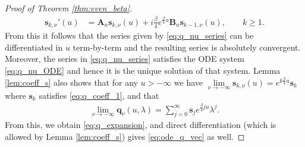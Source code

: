 \documentclass[12pt]{article}
\theoremstyle{definition} %
\theoremstyle{remark} %
\begin{document}
\begin{proof}[Proof of Theorem \ref{thm:even_beta}]
\begin{align}
        \mathbf{s}_{k,\nu}'(u)&= \mathbf{A}_n \mathbf{s}_{k,\nu}(u)+ i \tfrac{\beta}{4}e^{\frac{\beta}{4}u}\mathbf{B}_n \mathbf{s}_{k-1,\nu}(u), \qquad k\ge 1.\label{eq:coeff_s_ode2}
\end{align}
From this it follows that the series given by  \eqref{eq:q_nu_series} can be differentiated in $u$ term-by-term and the resulting series is absolutely convergent. Moreover, the series in \eqref{eq:q_nu_series} satisfies the ODE system \eqref{eq:q_nu_ODE} and hence it is the unique solution of that system.  Lemma \ref{lem:coeff_s} also shows that for any $u>-\infty$ we have $\lim\limits_{\nu\to -\infty} \mathbf{s}_{k,\nu}(u)=e^{k \frac{\beta}{4}u} \mathbf{s}_{k}$ where $\mathbf{s}_{k}$ satisfies \eqref{eq:q_coeff_1}, and that 
\begin{align}\label{eq:q_nu_lim}
    \lim_{\nu\to -\infty} \mathbf{q}_{\nu}(u,\lambda)=\sum_{j=0}^\infty \mathbf{s}_j e^{\frac{\beta}{4} j u} \lambda^j.
\end{align}
From this, we obtain \eqref{eq:q_expansion}, and direct differentiation (which is allowed by Lemma \ref{lem:coeff_s}) gives \eqref{eq:ode_q_vec} as well.
\end{proof}   
\end{document}
